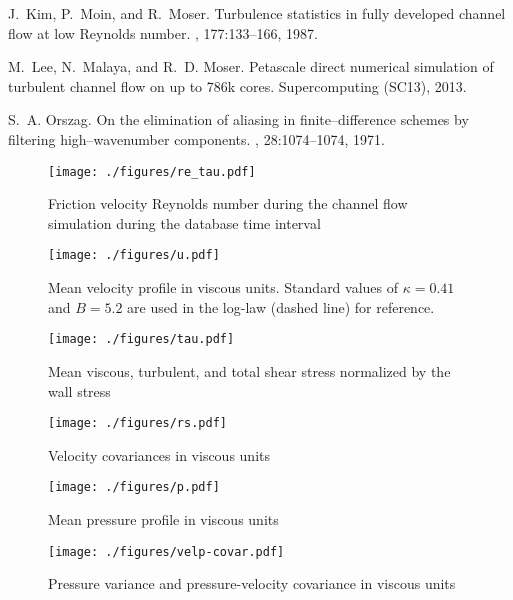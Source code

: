 \documentclass[11pt,letterpaper]{article}
\begin{document}

%
\begin{thebibliography}{1}

J.~Kim, P.~Moin, and R.~Moser.
\newblock Turbulence statistics in fully developed channel flow at low Reynolds
  number.
, 177:133--166, 1987.

M.~Lee, N.~Malaya, and R.~D. Moser.
\newblock Petascale direct numerical simulation of turbulent channel flow on up
  to 786k cores.
\newblock Supercomputing (SC13), 2013.

S.~A. Orszag.
\newblock On the elimination of aliasing in finite--difference schemes by
  filtering high--wavenumber components.
, 28:1074--1074, 1971.

\end{thebibliography}

\newpage

\begin{figure}[h]
  \centering
  \texttt{[image: ./figures/re\_tau.pdf]}
 \caption{Friction velocity Reynolds number during the channel flow simulation during the database time interval}
 \label{fig:re_tau}
\end{figure}

\begin{figure}[h]
  \centering
  \texttt{[image: ./figures/u.pdf]}
  \caption{Mean velocity profile in viscous units. Standard values of $\kappa=0.41$ and $B=5.2$ are used in the log-law (dashed line) for reference.}
 \label{fig:u}
\end{figure}

\begin{figure}[ht]
\centering
\begin{minipage}[b]{0.45\linewidth}
  \texttt{[image: ./figures/tau.pdf]}
  \caption{Mean viscous, turbulent, and total shear stress normalized by the wall stress}
  \label{fig:tau}
\end{minipage}
\quad
\begin{minipage}[b]{0.45\linewidth}
  \texttt{[image: ./figures/rs.pdf]}
  \caption{Velocity covariances in viscous units}
  \label{fig:rs}
\end{minipage}
\quad
\begin{minipage}[b]{0.45\linewidth}
  \texttt{[image: ./figures/p.pdf]}
  \caption{Mean pressure profile in viscous units}
  \label{fig:p}
\end{minipage}
\quad
\begin{minipage}[b]{0.45\linewidth}
  \texttt{[image: ./figures/velp-covar.pdf]}
  \caption{Pressure variance and pressure-velocity covariance in viscous units}
  \label{fig:velp-covar}
\end{minipage}

\end{figure}
\end{document}

